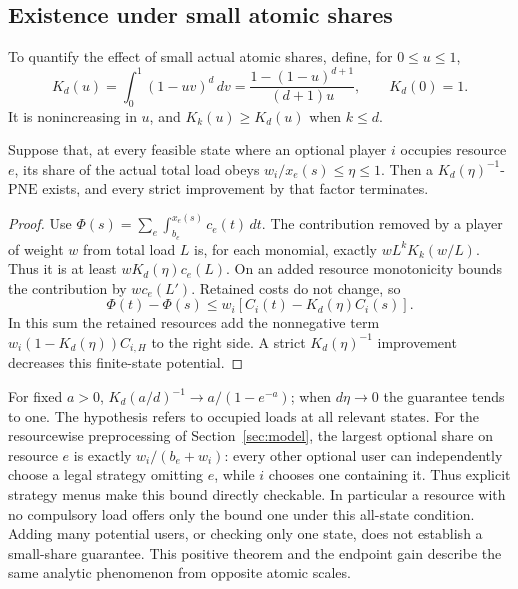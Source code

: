 \documentclass[manuscript,review,anonymous]{acmart}
\newcommand{\PNE}{\mathrm{PNE}}
\begin{document}
\subsection{Existence under small atomic shares}
To quantify the effect of small actual atomic shares, define, for $0\le u\le1$,
\begin{equation}\label{eq:kfunction}
 K_d(u)=\int_0^1(1-uv)^d\,dv
 =\frac{1-(1-u)^{d+1}}{(d+1)u},\qquad K_d(0)=1.
\end{equation}
It is nonincreasing in $u$, and $K_k(u)\ge K_d(u)$ when $k\le d$.
\begin{theorem}\label{thm:smallatom}
Suppose that, at every feasible state where an optional player $i$ occupies resource $e$, its share of the actual total load obeys $w_i/x_e(s)\le\eta\le1$. Then a $K_d(\eta)^{-1}$-$\PNE$ exists, and every strict improvement by that factor terminates.
\end{theorem}
\begin{proof}
Use $\Phi(s)=\sum_e\int_{b_e}^{x_e(s)}c_e(t)\,dt$. The contribution removed by a player of weight $w$ from total load $L$ is, for each monomial, exactly $wL^kK_k(w/L)$. Thus it is at least $wK_d(\eta)c_e(L)$. On an added resource monotonicity bounds the contribution by $wc_e(L')$. Retained costs do not change, so
\[
 \Phi(t)-\Phi(s)\le w_i[C_i(t)-K_d(\eta)C_i(s)].
\]
In this sum the retained resources add the nonnegative term $w_i(1-K_d(\eta))C_{i,H}$ to the right side. A strict $K_d(\eta)^{-1}$ improvement decreases this finite-state potential.
\end{proof}
For fixed $a>0$, $K_d(a/d)^{-1}\to a/(1-e^{-a})$; when $d\eta\to0$ the guarantee tends to one. The hypothesis refers to occupied loads at all relevant states. For the resourcewise preprocessing of Section~\ref{sec:model}, the largest optional share on resource $e$ is exactly $w_i/(b_e+w_i)$: every other optional user can independently choose a legal strategy omitting $e$, while $i$ chooses one containing it. Thus explicit strategy menus make this bound directly checkable. In particular a resource with no compulsory load offers only the bound one under this all-state condition. Adding many potential users, or checking only one state, does not establish a small-share guarantee. This positive theorem and the endpoint gain describe the same analytic phenomenon from opposite atomic scales.
\end{document}

